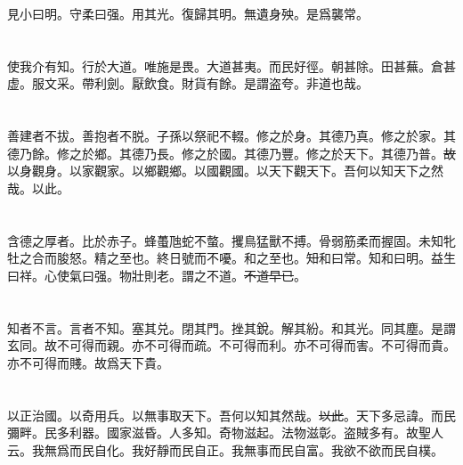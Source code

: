 \documentclass[a5paper]{ctexbook}
\newcommand{\bo}[1]{\textcolor[RGB]{0,255,255}{#1}}
\newcommand{\jian}[1]{\textcolor[RGB]{0,255,0}{#1}}
\def\del{\sout}
\begin{document}
    見小曰明。守柔曰强。用其光。復歸其明。無遺身殃。是爲\bo{襲}常。

    \chapter{}

    使我\bo{介}有知。行於大道。唯施是畏。大道甚夷。而民好徑。朝甚除。田甚蕪。倉甚虚。服文采。帶利劍。厭飲食。財貨有餘。是謂盗夸。非道也哉。

    \chapter{}

    善建者不拔。善抱者不脱。子孫以祭祀不輟。修之於身。其德乃真。修之於家。其德乃餘。修之於鄉。其德乃長。修之於國。其德乃豐。修之於天下。其德乃普。\bo{\del{故}}以身觀身。以家觀家。以鄉觀鄉。以國觀國。以天下觀天下。吾何以知天下\bo{之}然哉。以此。

    \chapter{}

    含德之厚\jian{者}。比於赤子。蜂蠆虺蛇不螫。\bo{攫鳥猛獸不搏}。骨弱筋柔而握固。未知牝牡之合而\bo{朘怒}。精之至也。終日號而不\bo{嚘}。和之至也。\jian{\del{知}}和曰常。知\jian{和}曰明。益生曰祥。心使氣曰强。物壯則老。謂之不道。\jian{\del{不道早已}}。

    \chapter{}

    知者不言。言者不知。塞其兑。閉其門。挫其銳。解其\jian{紛}。和其光。同其塵。是謂玄同。故不可得而親。\jian{亦}不可得而\bo{疏}。不可得而利。\jian{亦}不可得而害。不可得而貴。\jian{亦}不可得而賤。故爲天下貴。

    \chapter{}

    以正治國。以奇用兵。以無事取天下。吾何以知其然哉。\jian{\del{以此}}。天下多忌諱。而民彌\jian{畔}。民多利器。國家滋昏。人多\bo{知}。奇物滋起。\bo{法物}滋彰。盗賊多有。故聖人云。我無爲而民自化。我好靜而民自正。我無事而民自富。我\bo{欲不欲}而民自樸。

    \chapter{}
\end{document}
